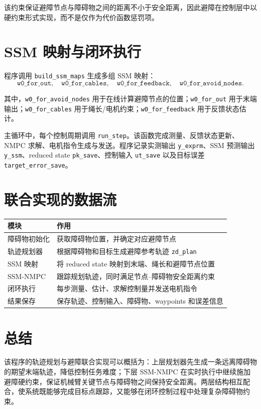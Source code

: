 \documentclass[11pt]{article}
\begin{document}
该约束保证避障节点与障碍物之间的距离不小于安全距离，因此避障在控制层中以硬约束形式实现，而不是仅作为代价函数惩罚项。

\section{SSM 映射与闭环执行}

程序调用 \texttt{build\_ssm\_maps} 生成多组 SSM 映射：
\[
\texttt{w0\_for\_out},\quad
\texttt{w0\_for\_cables},\quad
\texttt{w0\_for\_feedback},\quad
\texttt{w0\_for\_avoid\_nodes}.
\]

其中，\texttt{w0\_for\_avoid\_nodes} 用于在线计算避障节点的位置；\texttt{w0\_for\_out} 用于末端输出；\texttt{w0\_for\_cables} 用于绳长/电机约束；\texttt{w0\_for\_feedback} 用于反馈状态估计。

主循环中，每个控制周期调用 \texttt{run\_step}。该函数完成测量、反馈状态更新、NMPC 求解、电机指令生成与发送。程序记录实测输出 \texttt{y\_exprm}、SSM 预测输出 \texttt{y\_ssm}、reduced state \texttt{pk\_save}、控制输入 \texttt{ut\_save} 以及目标误差 \texttt{target\_error\_save}。

\section{联合实现的数据流}

\begin{center}
\begin{tabular}{@{}ll@{}}
\toprule
模块 & 作用 \\
\midrule
障碍物初始化 & 获取障碍物位置，并确定对应避障节点 \\
轨迹规划器 & 根据障碍物和目标生成避障参考轨迹 \texttt{zd\_plan} \\
SSM 映射 & 将 reduced state 映射到末端、绳长和避障节点位置 \\
SSM-NMPC & 跟踪规划轨迹，同时满足节点--障碍物安全距离约束 \\
闭环执行 & 每步测量、估计、求解控制量并发送电机指令 \\
结果保存 & 保存轨迹、控制输入、障碍物、waypoints 和误差信息 \\
\bottomrule
\end{tabular}
\end{center}

\section{总结}

该程序的轨迹规划与避障联合实现可以概括为：上层规划器先生成一条远离障碍物的期望末端轨迹，降低控制任务难度；下层 SSM-NMPC 在实时执行中继续施加避障硬约束，保证机械臂关键节点与障碍物之间保持安全距离。两层结构相互配合，使系统既能够完成目标点跟踪，又能够在闭环控制过程中处理复杂障碍物约束。
\end{document}

